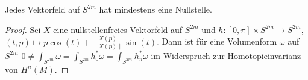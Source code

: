 \begin{st} \label{7.14}
    Jedes Vektorfeld auf $S^{2m}$ hat mindestens eine Nullstelle.
    \begin{proof}
        Sei $X$ eine nullstellenfreies Vektorfeld auf $S^{2m}$ und $h: [0, \pi] \times S^{2m} \to S^{2m}$,
        \begin{math}
            (t,p) \mapsto p \cos(t) + \frac{X(p)}{\|X(p)\|} \sin(t).
        \end{math}
        Dann ist für eine Volumenform $\omega$ auf $S^{2m}$
        \begin{math}
            0 \neq \int_{S^{2m}} \omega
            = \int_{S^{2m}} h_0^* \omega
            = \int_{S^{2m}} h_\pi^* \omega
        \end{math}
        im Widerspruch zur Homotopieinvarianz von $H^n(M)$.
    \end{proof}
\end{st}


